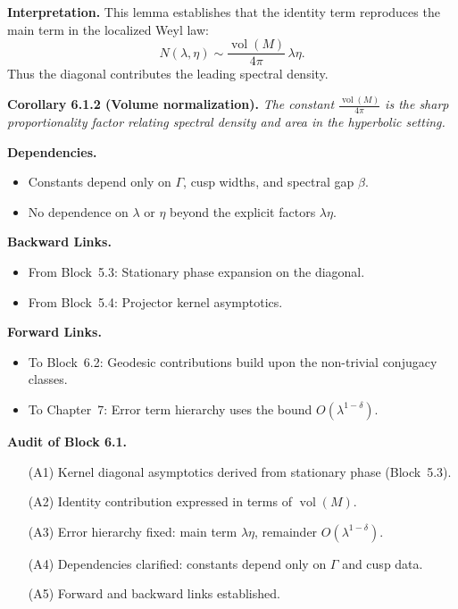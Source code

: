 \medskip

\noindent\textbf{Interpretation.}
This lemma establishes that the identity term reproduces the main term in the localized Weyl law:
\[
  N(\lambda,\eta) \sim \frac{\operatorname{vol}(M)}{4\pi}\, \lambda \eta.
\]
Thus the diagonal contributes the leading spectral density.

\medskip

\noindent\textbf{Corollary 6.1.2 (Volume normalization).}
\emph{The constant $\frac{\operatorname{vol}(M)}{4\pi}$ is the sharp proportionality factor relating spectral density and area in the hyperbolic setting.}

\medskip

\noindent\textbf{Dependencies.}
\begin{itemize}
  \item Constants depend only on $\Gamma$, cusp widths, and spectral gap $\beta$.
  \item No dependence on $\lambda$ or $\eta$ beyond the explicit factors $\lambda\eta$.
\end{itemize}

\medskip

\noindent\textbf{Backward Links.}
\begin{itemize}
  \item From Block~5.3: Stationary phase expansion on the diagonal.
  \item From Block~5.4: Projector kernel asymptotics.
\end{itemize}

\medskip

\noindent\textbf{Forward Links.}
\begin{itemize}
  \item To Block~6.2: Geodesic contributions build upon the non-trivial conjugacy classes.
  \item To Chapter~7: Error term hierarchy uses the bound $O(\lambda^{1-\delta})$.
\end{itemize}

\medskip

\noindent\textbf{Audit of Block 6.1.}
\begin{itemize}
  \item[(A1)] Kernel diagonal asymptotics derived from stationary phase (Block~5.3).
  \item[(A2)] Identity contribution expressed in terms of $\operatorname{vol}(M)$.
  \item[(A3)] Error hierarchy fixed: main term $\lambda \eta$, remainder $O(\lambda^{1-\delta})$.
  \item[(A4)] Dependencies clarified: constants depend only on $\Gamma$ and cusp data.
  \item[(A5)] Forward and backward links established.
\end{itemize}

